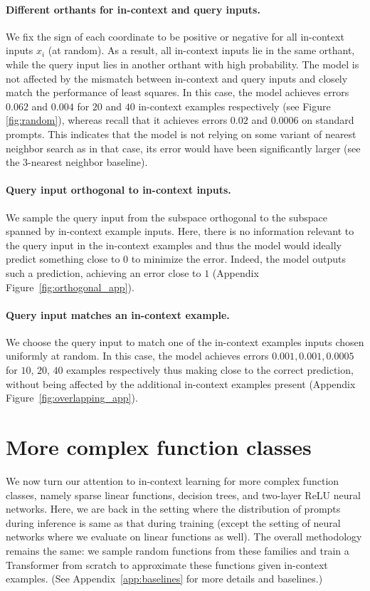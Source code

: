 \documentclass{article}
\begin{document}
\paragraph{Different orthants for in-context  and query inputs.} We fix the sign of each coordinate to be positive or negative for all in-context inputs $x_i$ (at random). 
As a result, all in-context inputs lie in the same orthant, while the query input lies in another orthant with high probability.
The model is not affected by the mismatch between in-context and query inputs and closely match the performance of least squares.
In this case, the model achieves errors $0.062$ and $0.004$ for $20$ and $40$ in-context examples respectively (see Figure \ref{fig:random}), whereas recall that it achieves errors $0.02$ and $0.0006$ on standard prompts. 
This indicates that the model is not relying on some variant of nearest neighbor search as in that case, its error would have been significantly larger (see the 3-nearest neighbor baseline).

\paragraph{Query input orthogonal to in-context inputs.} We sample the query input from the subspace orthogonal to the subspace spanned by in-context example inputs.
Here, there is no information relevant to the query input in the in-context examples and thus the model would ideally predict something close to 0 to minimize the error.
Indeed, the model outputs such a prediction, achieving an error close to $1$ (Appendix Figure~\ref{fig:orthogonal_app}).

\paragraph{Query input matches an in-context example.}
We choose the query input to match one of the in-context examples inputs chosen uniformly at random.
In this case, the model achieves errors $0.001, 0.001, 0.0005$ for $10$, $20$, $40$ examples respectively thus making close to the correct prediction, without being affected by the additional in-context examples present (Appendix Figure~\ref{fig:overlapping_app}).

\section{More complex function classes}
\label{sec:beyond_linear}

We now turn our attention to in-context learning for more complex function classes, namely sparse linear functions, decision trees, and two-layer ReLU neural networks. Here, we are back in the setting where the distribution of prompts during inference is same as that during training (except the setting of neural networks where we evaluate on linear functions as well).
The overall methodology remains the same: we sample random functions from these families and train a Transformer from scratch to approximate these functions given in-context examples. (See Appendix~\ref{app:baselines} for more details and baselines.) 
\end{document}
